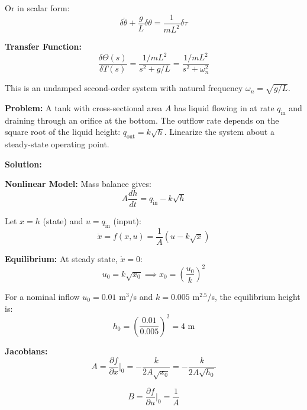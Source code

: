 \begin{examplebox}
Or in scalar form:
\begin{equation}
\boxed{\delta\ddot{\theta} + \frac{g}{L}\delta\theta = \frac{1}{mL^2}\delta\tau}
\end{equation}

\textbf{Transfer Function:}
\begin{equation}
\frac{\delta\Theta(s)}{\delta T(s)} = \frac{1/mL^2}{s^2 + g/L} = \frac{1/mL^2}{s^2 + \omega_n^2}
\end{equation}

This is an undamped second-order system with natural frequency $\omega_n = \sqrt{g/L}$.
\end{examplebox}

\begin{examplebox}
\textbf{Problem:} A tank with cross-sectional area $A$ has liquid flowing in at rate $q_{\text{in}}$ and draining through an orifice at the bottom. The outflow rate depends on the square root of the liquid height: $q_{\text{out}} = k\sqrt{h}$. Linearize the system about a steady-state operating point.

\textbf{Solution:}

\textbf{Nonlinear Model:} Mass balance gives:
\begin{equation}
A\frac{dh}{dt} = q_{\text{in}} - k\sqrt{h}
\end{equation}

Let $x = h$ (state) and $u = q_{\text{in}}$ (input):
\begin{equation}
\dot{x} = f(x, u) = \frac{1}{A}\left(u - k\sqrt{x}\right)
\end{equation}

\textbf{Equilibrium:} At steady state, $\dot{x} = 0$:
\begin{equation}
u_0 = k\sqrt{x_0} \implies x_0 = \left(\frac{u_0}{k}\right)^2
\end{equation}

For a nominal inflow $u_0 = 0.01$ m$^3$/s and $k = 0.005$ m$^{2.5}$/s, the equilibrium height is:
\begin{equation}
h_0 = \left(\frac{0.01}{0.005}\right)^2 = 4 \text{ m}
\end{equation}

\textbf{Jacobians:}
\begin{equation}
A = \frac{\partial f}{\partial x}\bigg|_0 = -\frac{k}{2A\sqrt{x_0}} = -\frac{k}{2A\sqrt{h_0}}
\end{equation}

\begin{equation}
B = \frac{\partial f}{\partial u}\bigg|_0 = \frac{1}{A}
\end{equation}


\end{examplebox}
